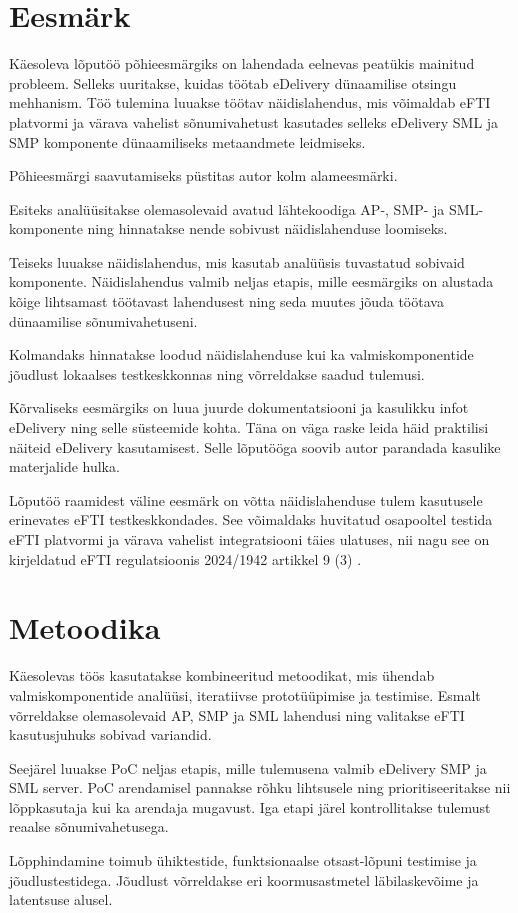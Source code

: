 \section{Eesmärk}

Käesoleva lõputöö põhieesmärgiks on lahendada eelnevas peatükis mainitud probleem.
Selleks uuritakse, kuidas töötab eDelivery dünaamilise otsingu mehhanism. 
Töö tulemina luuakse töötav näidislahendus, mis võimaldab eFTI platvormi ja värava
vahelist sõnumivahetust kasutades selleks eDelivery SML ja SMP komponente dünaamiliseks
metaandmete leidmiseks.

Põhieesmärgi saavutamiseks püstitas autor kolm alameesmärki.

Esiteks analüüsitakse olemasolevaid avatud lähtekoodiga AP-, SMP- ja SML-komponente 
ning hinnatakse nende sobivust näidislahenduse loomiseks. 

Teiseks luuakse näidislahendus, mis kasutab analüüsis tuvastatud sobivaid komponente.
Näidislahendus valmib neljas etapis, mille eesmärgiks on alustada kõige lihtsamast töötavast
lahendusest ning seda muutes jõuda töötava dünaamilise sõnumivahetuseni.

Kolmandaks hinnatakse loodud näidislahenduse kui ka valmiskomponentide jõudlust
lokaalses testkeskkonnas ning võrreldakse saadud tulemusi. 

Kõrvaliseks eesmärgiks on luua juurde dokumentatsiooni 
ja kasulikku infot eDelivery ning selle süsteemide kohta.
Täna on väga raske leida häid praktilisi näiteid eDelivery kasutamisest. 
Selle lõputööga soovib autor parandada kasulike materjalide hulka.

Lõputöö raamidest väline eesmärk on võtta näidislahenduse tulem kasutusele erinevates eFTI 
testkeskkondades. See võimaldaks huvitatud osapooltel testida eFTI platvormi ja värava 
vahelist integratsiooni täies ulatuses, nii nagu see on kirjeldatud eFTI regulatsioonis 
2024/1942 artikkel 9 (3) \cite{eu_reg_2024_1942}. 

\section{Metoodika}\label{methodology}

Käesolevas töös kasutatakse kombineeritud metoodikat, mis ühendab valmiskomponentide analüüsi,
iteratiivse prototüüpimise ja testimise.
Esmalt võrreldakse olemasolevaid AP, SMP ja SML lahendusi ning valitakse eFTI kasutusjuhuks sobivad variandid.

Seejärel luuakse PoC neljas etapis, mille tulemusena valmib eDelivery SMP ja SML server.
PoC arendamisel pannakse rõhku lihtsusele ning prioritiseeritakse
nii lõppkasutaja kui ka arendaja mugavust.
Iga etapi järel kontrollitakse tulemust reaalse sõnumivahetusega.

Lõpphindamine toimub ühiktestide, funktsionaalse otsast-lõpuni testimise ja jõudlustestidega.
Jõudlust võrreldakse eri koormusastmetel läbilaskevõime ja latentsuse alusel.
